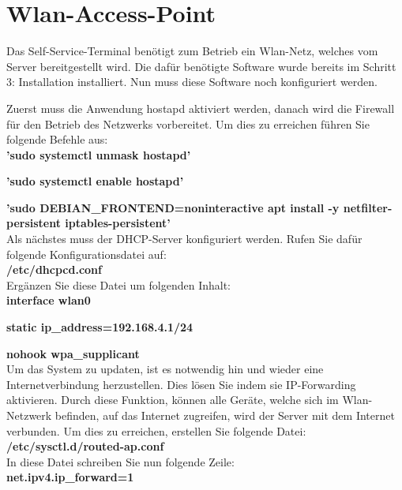 \section{Wlan-Access-Point}

Das Self-Service-Terminal benötigt zum Betrieb ein Wlan-Netz, welches vom Server bereitgestellt wird. Die dafür benötigte Software wurde bereits im Schritt 3: \glqq Installation\grqq{} installiert. Nun muss diese Software noch konfiguriert werden.\par
\noindent Zuerst muss die Anwendung hostapd aktiviert werden, danach wird die Firewall für den Betrieb des Netzwerks vorbereitet. Um dies zu erreichen führen Sie folgende Befehle aus:\\

\textbf{’sudo systemctl unmask hostapd’}\par
\textbf{’sudo systemctl enable hostapd’}\par
\textbf{’sudo DEBIAN\_FRONTEND=noninteractive apt install -y netfilter-\indent persistent iptables-persistent’}\\

\noindent Als nächstes muss der DHCP-Server konfiguriert werden. Rufen Sie dafür folgende Konfigurationsdatei auf:\\

\textbf{/etc/dhcpcd.conf}\\

\noindent Ergänzen Sie diese Datei um folgenden Inhalt:\\

\textbf{interface wlan0}\par
\textbf{static ip\_address=192.168.4.1/24}\par
\textbf{nohook wpa\_supplicant}\\

\noindent Um das System zu updaten, ist es notwendig hin und wieder eine Internetverbindung herzustellen. Dies lösen Sie indem sie IP-Forwarding aktivieren. Durch diese Funktion, können alle Geräte, welche sich im Wlan-Netzwerk befinden, auf das Internet zugreifen, wird der Server mit dem Internet verbunden. Um dies zu erreichen, erstellen Sie folgende Datei:\\

\textbf{/etc/sysctl.d/routed-ap.conf}\\

\noindent In diese Datei schreiben Sie nun folgende Zeile:\\

\textbf{net.ipv4.ip\_forward=1}\\

